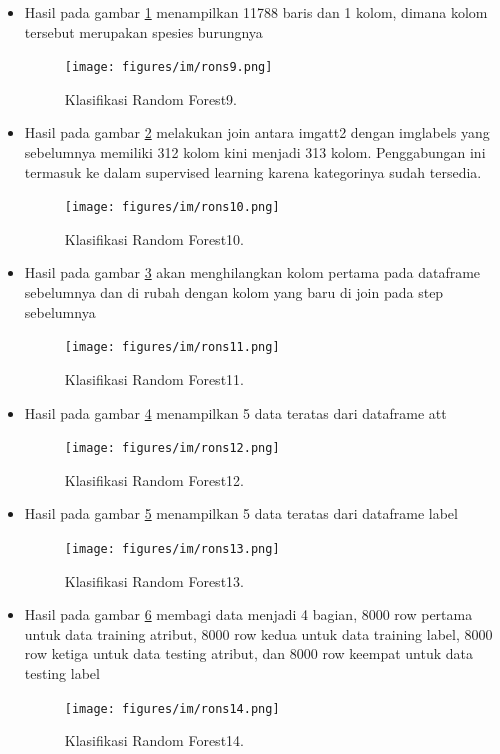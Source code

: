 \begin{enumerate}
\begin{itemize}
\item Hasil pada gambar \ref{rons9} menampilkan 11788 baris dan 1 kolom, dimana kolom tersebut merupakan spesies burungnya
 		\begin{figure}[ht]
		\centerline{\texttt{[image: figures/im/rons9.png]}}
		\caption{Klasifikasi Random Forest9.}
		\label{rons9}
		\end{figure}

\item Hasil pada gambar \ref{rons10} melakukan join antara imgatt2 dengan imglabels yang sebelumnya memiliki 312 kolom kini menjadi 313 kolom. Penggabungan ini termasuk ke dalam supervised learning karena kategorinya sudah tersedia.
 		\begin{figure}[ht]
		\centerline{\texttt{[image: figures/im/rons10.png]}}
		\caption{Klasifikasi Random Forest10.}
		\label{rons10}
		\end{figure}

\item Hasil pada gambar \ref{rons11} akan menghilangkan kolom pertama pada dataframe sebelumnya dan di rubah dengan kolom yang baru di join pada step sebelumnya
 		\begin{figure}[ht]
		\centerline{\texttt{[image: figures/im/rons11.png]}}
		\caption{Klasifikasi Random Forest11.}
		\label{rons11}
		\end{figure}

\item Hasil pada gambar \ref{rons12} menampilkan 5 data teratas dari dataframe att
 		\begin{figure}[ht]
		\centerline{\texttt{[image: figures/im/rons12.png]}}
		\caption{Klasifikasi Random Forest12.}
		\label{rons12}
		\end{figure}

\item Hasil pada gambar \ref{rons13} menampilkan 5 data teratas dari dataframe label
 		\begin{figure}[ht]
		\centerline{\texttt{[image: figures/im/rons13.png]}}
		\caption{Klasifikasi Random Forest13.}
		\label{rons13}
		\end{figure}

\item Hasil pada gambar \ref{rons14} membagi data menjadi 4 bagian, 8000 row pertama untuk data training atribut, 8000 row kedua untuk data training label, 8000 row ketiga untuk data testing atribut, dan 8000 row keempat untuk data testing label
 		\begin{figure}[ht]
		\centerline{\texttt{[image: figures/im/rons14.png]}}
		\caption{Klasifikasi Random Forest14.}
		\label{rons14}
		\end{figure}


\end{itemize}
\end{enumerate}
